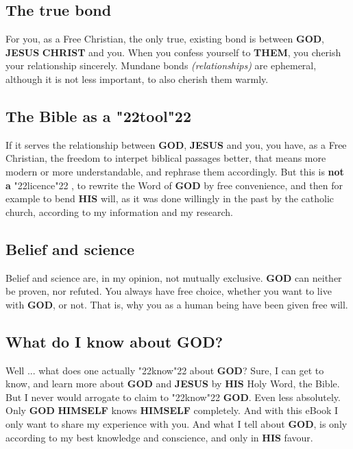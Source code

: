\documentclass[12pt,a4paper]{article}
\newcommand{\Christ}[0]{\textbf{CHRIST}}
\newcommand{\God}[0]{\textbf{GOD}}
\newcommand{\Himself}[0]{\textbf{HIMSELF}}
\newcommand{\His}[0]{\textbf{HIS}}
\newcommand{\Jesus}[0]{\textbf{JESUS}}
\newcommand{\Them}[0]{\textbf{THEM}}
\newcommand{\q}[1]{\char"22{#1}\char"22 }
\begin{document}
	\subsection{The true bond}
		For you,
		as a Free Christian,
		the only true,
		existing bond is between {\God},
		{\Jesus} {\Christ} and you.
		When you confess yourself to {\Them},
		you cherish your relationship sincerely.
		Mundane bonds \textit{(relationships)} are ephemeral,
		although it is not less important,
		to also cherish them warmly.
			
	\subsection{The Bible as a \q{tool}}
		If it serves the relationship between {\God},
		{\Jesus} and you,
		you have,
		as a Free Christian,
		the freedom to interpet biblical passages better,
		that means more modern or more understandable,
		and rephrase them accordingly.
		But this is \textbf{not a} \q{licence},
		to rewrite the Word of {\God} by free convenience,
		and then for example to bend {\His} will,
		as it was done willingly in the past by the catholic church,
		according to my information and my research.
		
	\subsection{Belief and science}
		Belief and science are,
		in my opinion,
		not mutually exclusive.
		{\God} can neither be proven,
		nor refuted.
		You always have free choice,
		whether you want to live with {\God},
		or not.
		That is,
		why you as a human being have been given free will.

	\subsection{What do I know about {\God}?}
		Well ... what does one actually \q{know} about {\God}?
		Sure,
		I can get to know,
		and learn more about {\God} and {\Jesus} by {\His} Holy Word,
		the Bible.
		But I never would arrogate to claim to \q{know} {\God}.
		Even less absolutely.
		Only {\God} {\Himself} knows {\Himself} completely.
		And with this eBook I only want to share my experience with you.
		And what I tell about {\God},
		is only according to my best knowledge and conscience,
		and only in {\His} favour.
	
	\newpage
\end{document}
